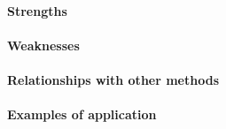 \paragraph{Strengths}
\paragraph{Weaknesses}
\paragraph{Relationships with other methods}
\paragraph{Examples of application}



